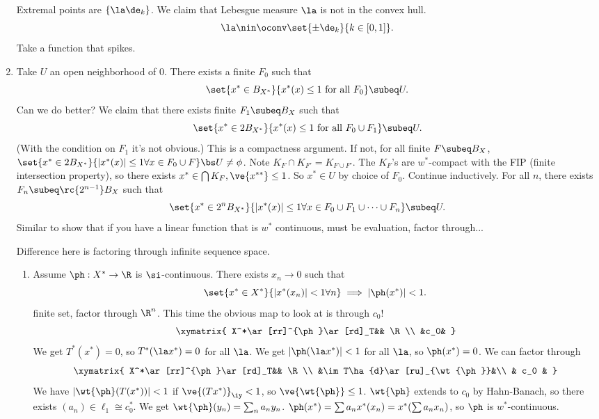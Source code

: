 \begin{enumerate}
Extremal points are $\{\la \de_k\}$. We claim that Lebesgue measure $\la$ is not in the convex hull.
\[
\la \nin \oconv\set{\pm \de_k}{k\in [0,1]}.
\]
Take a function that spikes.
\item {}
Take $U$ an open neighborhood of 0. There exists a finite $F_0$ such that 
\[
\set{x^*\in B_{X^*}}{x^*(x)\le 1\text{ for all }F_0}\subeq U.
\]
Can we do better? We claim that there exists finite $F_1\subeq B_X$ such that
\[
\set{x^*\in 2B_{X^*}}{x^*(x)\le 1\text{ for all }F_0\cup F_1}\subeq U.
\]
(With the condition on $F_1$ it's not obvious.) This is a compactness argument. If not, for all finite $F\subeq B_X$, $\set{x^*\in 2B_{X^*}}{|x^*(x)|\le 1\forall x\in F_0\cup F}\bs U\ne \phi$. Note $K_{F}\cap K_{F'}=K_{F\cup F'}$. %
The $K_F$'s are $w^*$-compact with the FIP (finite intersection property), so there exists $x^*\in \bigcap K_F, \ve{x^{**}}\le 1$. So $x^*\in U$ by choice of $F_0$. Continue inductively. For all $n$, there exists $F_n\subeq \rc{2^{n-1}}B_X$ such that
\[
\set{x^*\in 2^n B_{X^*}}{|x^*(x)|\le 1\forall x\in F_0\cup F_1\cup \cdots \cup F_n}\subeq U.
\]
Similar to show that if you have a linear function that is $w^*$ continuous, must be evaluation, factor through...

Difference here is factoring through infinite sequence space.
\begin{enumerate}
\item
Assume $\ph:X^*\to \R$ is $\si$-continuous. There exists $x_n\to 0$ such that
\[
\set{x^*\in X^*}{|x^*(x_n)|<1\forall n}\implies |\ph(x^*)|<1.
\]
finite set, factor through $\R^n$. This time the obvious map to look at is through $c_0$!
\[
\xymatrix{
X^*\ar[rr]^{\ph}\ar[rd]_T&& \R\\
&c_0&
}
\]
We get $T^*(x^*)=0$, so $T^*(\la x^*)=0$ for all $\la$. We get $|\ph(\la x^*)|<1$ for all $\la$, so $\ph(x^*)=0$. We can factor through
\[
\xymatrix{
X^*\ar[rr]^{\ph}\ar[rd]_T&& \R\\
&\im T\ha{d}\ar[ru]_{\wt{\ph}}&\\
& c_0 &
}
\]
We have $|\wt{\ph}(T(x^*))|<1$ if $\ve{(Tx^*)}_{\iy}<1$, so $\ve{\wt{\ph}}\le 1$. $\wt{\ph}$ extends to $c_0$ by Hahn-Banach, so there exists $(a_n)\in \ell_1\cong c_0^*$. We get $\wt{\ph}(y_n)=\sum_n a_n y_n$. $\ph(x^*)=\sum a_n x^*(x_n)=x^*(\sum a_nx_n)$, so $\ph$ is $w^*$-continuous.


\end{enumerate}
\end{enumerate}
